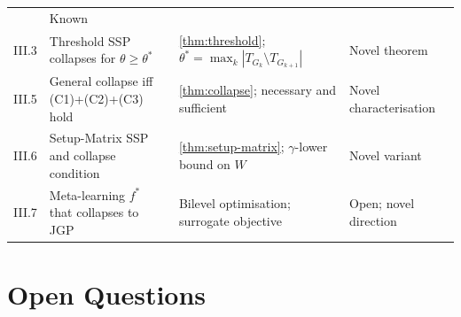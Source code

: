 \documentclass[11pt,a4paper]{article}
\theoremstyle{plain}
\theoremstyle{definition}
\begin{document}
\begin{table}[h!]
\begin{tabularx}{\textwidth}{@{} l X X l @{}}
  & Known \\
III.3 & Threshold SSP collapses for $\theta \ge \theta^*$
  & \cref{thm:threshold}; $\theta^* = \max_k |T_{G_k} \setminus T_{G_{k+1}}|$
  & Novel theorem \\
III.5 & General collapse iff (C1)+(C2)+(C3) hold
  & \cref{thm:collapse}; necessary and sufficient
  & Novel characterisation \\
III.6 & Setup-Matrix SSP and collapse condition
  & \cref{thm:setup-matrix}; $\gamma$-lower bound on $W$
  & Novel variant \\
III.7 & Meta-learning $f^*$ that collapses to JGP
  & Bilevel optimisation; surrogate objective
  & Open; novel direction \\
\bottomrule
\end{tabularx}
\end{table}

\section{Open Questions}
\label{sec:open}
\end{document}
